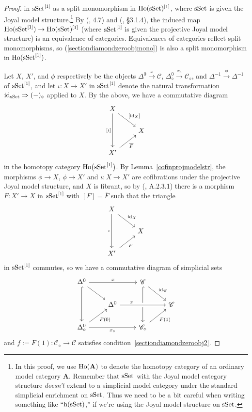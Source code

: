 \documentclass{tac}
\newcommand{\s}[1]{\mathscr{#1}}
\renewcommand{\bf}[1]{\mathbf{#1}}
\newcommand{\ol}[1]{\overline{#1}}
\newcommand{\tx}[1]{\textnormal{#1}}
\begin{document}
\begin{proof}
in $\tx{sSet}^{[1]}$ as a split monomorphism in $\tx{Ho}(\tx{sSet})^{[1]}$, where $\tx{sSet}$ is given the Joyal model structure.\footnote{In this proof, we use $\tx{Ho}(\bf{A})$ to denote the homotopy category of an ordinary model category $\bf{A}$.  Remember that $\tx{sSet}$ with the Joyal model category structure \emph{doesn't} extend to a simplicial model category under the standard simplicial enrichment on $\tx{sSet}$.  Thus we need to be a bit careful when writing something like ``$\tx{h}(\tx{sSet})$,'' if we're using the Joyal model structure on $\tx{sSet}$.}  By (\cite{cordierporterhomotopycoherent}, 4.7) and (\cite{htt}, \S 3.1.4), the induced map $\tx{Ho}(\tx{sSet}^{[1]}) \to \tx{Ho}(\tx{sSet})^{[1]}$ (where $\tx{sSet}^{[1]}$ is given the projective Joyal model structure) is an equivalence of categories.  Equivalences of categories reflect split monomorphisms, so (\ref{sectiondiamondzeroobjmono}) is also a split monomorphism in $\tx{Ho}(\tx{sSet}^{[1]})$.

Let $X$, $X'$, and $\phi$ respectively be the objects $\Delta^0 \xrightarrow{x} \s{C}$, $\Delta^0_\diamond \xrightarrow{x_\diamond} \s{C}_\diamond$, and $\Delta^{-1} \xrightarrow{\phi} \Delta^{-1}$ of $\tx{sSet}^{[1]}$, and let $\iota : X\to X'$ in $\tx{sSet}^{[1]}$ denote the natural transformation $\tx{id}_{\tx{sSet}} \Rightarrow (-)_\diamond$ applied to $X$.  By the above, we have a commutative diagram
\[\begin{tikzcd}
X \arrow[]{dd}[swap]{[\iota]} \arrow[]{dr}{[\tx{id}_X]} & \\
 & X \\
 X' \arrow[]{ur}[swap]{\ol{F}} &
\end{tikzcd}\]
in the homotopy category $\tx{Ho}\big( \tx{sSet}^{[1]} \big)$. By Lemma~\ref{cofinprojmodelstr}, the morphisms $\phi \to X$, $\phi \to X'$ and $\iota : X\to X'$ are cofibrations under the projective Joyal model structure, and $X$ is fibrant, so by (\cite{htt}, A.2.3.1) there is a morphism $F : X' \to X$ in $\tx{sSet}^{[1]}$ with $[F] = \ol{F}$ such that the triangle
\[\begin{tikzcd}
X \arrow[]{dd}[swap]{\iota} \arrow[]{dr}{\tx{id}_X} & \\
 & X \\
 X' \arrow[]{ur}[swap]{F} &
\end{tikzcd}\]
in $\tx{sSet}^{[1]}$ commutes, so we have a commutative diagram of simplicial sets
\[\begin{tikzcd}
 \Delta^0 \arrow[]{rr}{x} \arrow[]{dr} \arrow[hook]{dd} & & \s{C} \arrow[]{dr}{\tx{id}_{\s{C}}} \arrow[hook]{dd} & \\
 & \Delta^0 \arrow[crossing over]{rr}[near start]{x} & & \s{C} \\
\Delta^0_\diamond  \arrow[]{ur}[swap]{F(0)} \arrow[]{rr}[swap]{x_\diamond} & & \s{C}_\diamond \arrow[]{ur}[swap]{F(1)} &
\end{tikzcd}\]
and $f := F(1) : \s{C}_\diamond \to \s{C}$ satisfies condition~\ref{sectiondiamondzeroobj2}.
\end{proof}
\end{document}
